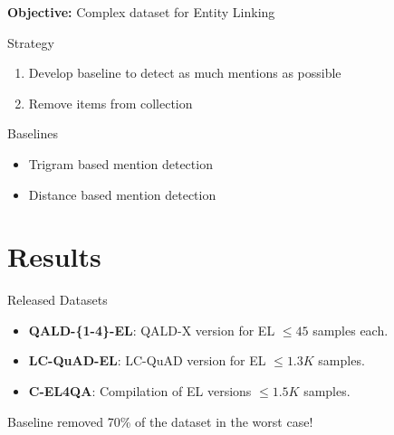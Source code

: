 \documentclass[]{beamer}
\def\mAlertSpace{\vspace{0.5em}}
\newcommand{\mSlideTitle}{{{\secname}}}
\begin{document}
  \begin{frame}{\mSlideTitle}
    \textcolor{mLightBrown}{\textbf{Objective:}} Complex dataset for Entity Linking
    \begin{alertblock}{Strategy}
      \begin{enumerate}
        \item Develop baseline to detect as much mentions as possible
        \item Remove items from collection
      \end{enumerate}
    \end{alertblock}
    \begin{alertblock}{Baselines}
      \begin{itemize}
        \item Trigram based mention detection
        \item Distance based mention detection
      \end{itemize}
    \end{alertblock}
  \end{frame}

\section{Results}
  \begin{frame}{\mSlideTitle}
    \begin{alertblock}{Released Datasets}
      \begin{itemize}
        \item \textbf{QALD-\{1-4\}-EL}: QALD-X version for EL $\le 45$ samples each.
        \item \textbf{LC-QuAD-EL}: LC-QuAD version for EL $\le 1.3K$ samples.
        \item \textbf{C-EL4QA}: Compilation of EL versions $\le 1.5K$ samples.
      \end{itemize}
      \mAlertSpace
      Baseline removed 70\% of the dataset in the worst case!
    \end{alertblock}
  \end{frame}
\end{document}
